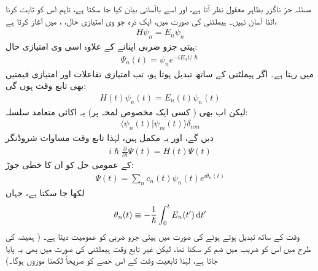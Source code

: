  
مسئلہ حرّ ناگزر بظاہر معقول نظر آتا ہے، اور اسے باآسانی بیان کیا جا سکتا ہے، تاہم اس کو ثابت کرنا اتنا آسان نہیں۔  ہیملٹنی کی صورت میں، ایک ذرہ جو  وی امتیازی حال، ، میں آغاز کرتا ہے،
\begin{align}
H \psi_n = E_n \psi_n
\end{align}
 ہیتی جزو ضربی اپنانے کے علاوہ اسی  وی امتیازی حال:
\begin{align}
\Psi_n (t) = \psi_n e^{-i E_n t/ \hslash}
\end{align}
میں رہتا ہے۔ اگر ہیملٹنی  کے ساتھ تبدیل ہوتا ہو، تب امتیازی تفاعلات اور امتیازی قیمتیں بھی تابع وقت ہوں گی:
\begin{align}\label{مساوات_حر_تابع_وقت_ہیملٹنی_توانائی}
H(t) \psi_n (t) = E_n (t) \psi_n (t)
\end{align}
لیکن اب بھی ( کسی ایک مخصوص لمحہ پر) یہ اکائی متعامد سلسلہ: 
\begin{align}\label{مساوات_حر_لمحاتی_معیاری_عمودی}
\langle \psi_n (t) | \psi_m (t) \rangle \delta_{nm} 
\end{align}
دیں گے، اور یہ مکمل ہیں، لہٰذا تابع وقت مساوات شروڈنگر 
\begin{align}\label{مساوات_حر_مساوات_شروڈنگر_الف}
i \hslash \frac{\partial}{\partial t} \Psi (t) = H (t) \Psi (t)
\end{align}
کے عمومی حل کو ان کا خطی جوڑ:
\begin{align}\label{مساوات_حر_مساوات_شروڈنگر_ب}
\Psi (t) = \sum_n c_n (t) \psi_n (t) e^{i \theta_n (t)}
\end{align}
لکھا جا سکتا ہے، جہاں 
\begin{align}\label{مساوات_حر_مساوات_شروڈنگر_پ}
\theta_n (t) \equiv - \frac{1}{\hslash} \int_0^t E_n (t') \dif t'
\end{align}
وقت کے ساتھ تبدیل ہوتے ہوئے  کی صورت میں  ہیتی جزو ضربی کو عمومیت دیتا ہے۔ ( ہمیشہ کی طرح میں اس کو  ضریب   میں ضم کر سکتا تھا، لیکن غیر تابع وقت ہیملٹنی کی صورت میں بھی یہ پایا جاتا ہے، لہٰذا تابعیت وقت کے اس حصے کو صریحاً لکھنا موزوں ہوگا۔) 

